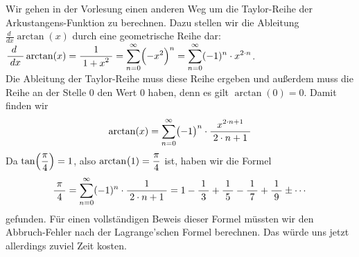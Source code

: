 Wir gehen in der Vorlesung einen anderen Weg um die Taylor-Reihe der Arkustangens-Funktion
zu berechnen.  Dazu  stellen wir
die Ableitung $\frac{d\;}{dx}\arctan(x)$ durch eine geometrische Reihe dar: 
\\[0.3cm]
\hspace*{1.3cm}
$\displaystyle\frac{\;\displaystyle d\;\;}{\;\displaystyle dx\;}\arctan(x) = \displaystyle\frac{\;\displaystyle1\;}{\;\displaystyle1+{x}^{2}\;} = \displaystyle \sum\limits_{n=0}^\infty \Bigl(-x^2\Bigr)^n = \sum\limits_{n=0}^\infty (-1)^n \cdot  x^{2\cdot n}$.
\\[0.3cm] 
Die Ableitung der Taylor-Reihe muss diese Reihe ergeben und au{\ss}erdem muss die Reihe an der
Stelle $0$ den Wert $0$ haben, denn es gilt $\arctan(0) = 0$.  Damit finden wir 
\begin{equation}
  \label{eq:taylorArctan}
  \arctan(x) = \sum\limits_{n=0}^\infty \bigl(-1\bigr)^n \cdot  \displaystyle\frac{\;\displaystyle x^{2\cdot n+1}\;}{\;\displaystyle2\cdot n+1\;}
\end{equation}
Da $\displaystyle\tan\Bigl(\frac{\pi}{4}\Bigr) = 1$, also $\displaystyle\arctan\bigl(1) = \frac{\pi}{4}$ ist, haben wir die Formel
\begin{equation}
  \label{eq:PiViertel}
  \displaystyle\frac{\;\displaystyle\pi\;}{\;\displaystyle4\;} = \sum\limits_{n=0}^\infty (-1)^n \cdot  \displaystyle\frac{\;\displaystyle1\;}{\;\displaystyle2\cdot n+1\;} = 
  1 - \displaystyle\frac{\;\displaystyle1\;}{\;\displaystyle3\;} + \displaystyle\frac{\;\displaystyle1\;}{\;\displaystyle5\;} - \displaystyle\frac{\;\displaystyle1\;}{\;\displaystyle7\;} + \displaystyle\frac{\;\displaystyle1\;}{\;\displaystyle9\;} \pm \cdots
\end{equation}
gefunden.  F\"ur einen vollst\"andigen Beweis dieser Formel m\"ussten wir den Abbruch-Fehler
nach der Lagrange'schen Formel berechnen.  Das w\"urde uns jetzt allerdings zuviel Zeit
kosten.

